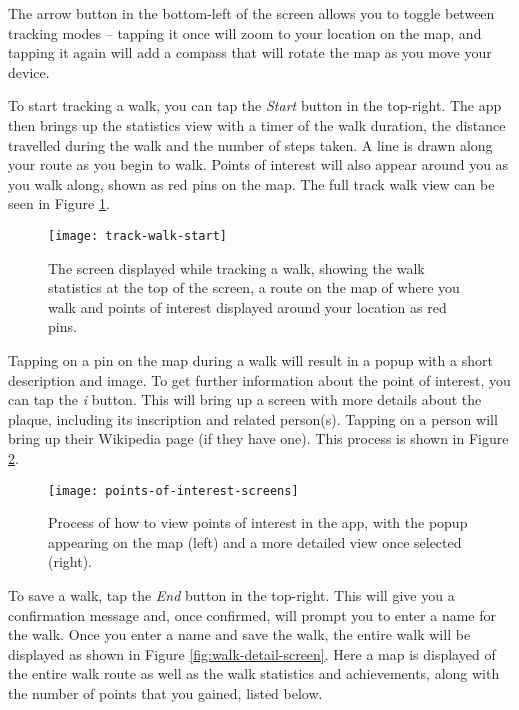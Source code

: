The arrow button in the bottom-left of the screen allows you to toggle between tracking modes -- tapping it once will zoom to your location on the map, and tapping it again will add a compass that will rotate the map as you move your device.

To start tracking a walk, you can tap the \textit{Start} button in the top-right. The app then brings up the statistics view with a timer of the walk duration, the distance travelled during the walk and the number of steps taken. A line is drawn along your route as you begin to walk. Points of interest will also appear around you as you walk along, shown as red pins on the map. The full track walk view can be seen in Figure \ref{fig:track-walk-start}.

\begin{figure}[hbt]
  \centering
  \texttt{[image: track-walk-start]}
  \caption{The screen displayed while tracking a walk, showing the walk statistics at the top of the screen, a route on the map of where you walk and points of interest displayed around your location as red pins.}
  \label{fig:track-walk-start}
\end{figure}


Tapping on a pin on the map during a walk will result in a popup with a short description and image. To get further information about the point of interest, you can tap the \textit{i} button. This will bring up a screen with more details about the plaque, including its inscription and related person(s). Tapping on a person will bring up their Wikipedia page (if they have one). This process is shown in Figure \ref{fig:points-of-interest-screens}.

\begin{figure}[hbt]
  \centering
  \texttt{[image: points-of-interest-screens]}
  \caption{Process of how to view points of interest in the app, with the popup appearing on the map (left) and a more detailed view once selected (right).}
  \label{fig:points-of-interest-screens}
\end{figure}


To save a walk, tap the \textit{End} button in the top-right. This will give you a confirmation message and, once confirmed, will prompt you to enter a name for the walk. Once you enter a name and save the walk, the entire walk will be displayed as shown in Figure \ref{fig:walk-detail-screen}. Here a map is displayed of the entire walk route as well as the walk statistics and achievements, along with the number of points that you gained, listed below.

